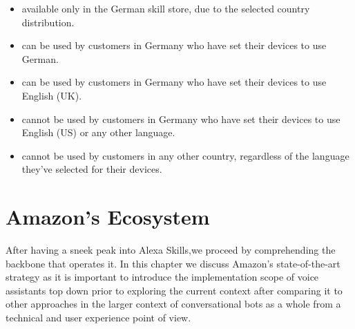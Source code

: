 \begin{itemize}
	
	\item available only in the German skill store, due to the selected country distribution.
	\item can be used by customers in Germany who have set their devices to use German.
	\item can be used by customers in Germany who have set their devices to use English (UK).
	\item cannot be used by customers in Germany who have set their devices to use English (US) or any other language.
	\item cannot be used by customers in any other country, regardless of the language they've selected for their devices.
	
\end{itemize}



















\chapter{Amazon's Ecosystem}
\label{amznecosys}

%



After having a sneek peak into Alexa Skills,we proceed by comprehending the backbone that operates it.
In this chapter we discuss Amazon's state-of-the-art strategy
as it is important to introduce the implementation scope of voice assistants 
top down
prior to exploring the current context 
after comparing it to other approaches in the larger context of conversational bots as a whole from a technical and user experience point of view. 


